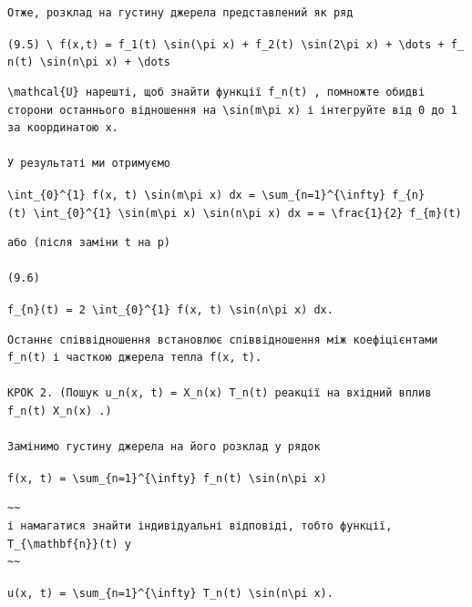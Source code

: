 \documentclass[
  ukrainian,
]{article}
\begin{document}
\begin{verbatim}
Отже, розклад на густину джерела представлений як ряд
\end{verbatim}

\texttt{(9.5)\ \textbackslash{}\ f(x,t)\ =\ f\_1(t)\ \textbackslash{}sin(\textbackslash{}pi\ x)\ +\ f\_2(t)\ \textbackslash{}sin(2\textbackslash{}pi\ x)\ +\ \textbackslash{}dots\ +\ f\_n(t)\ \textbackslash{}sin(n\textbackslash{}pi\ x)\ +\ \textbackslash{}dots}

\begin{verbatim}
\mathcal{U} нарешті, щоб знайти функції f_n(t) , помножте обидві сторони останнього відношення на \sin(m\pi x) і інтегруйте від 0 до 1 за координатою x.

У результаті ми отримуємо
\end{verbatim}

\texttt{\textbackslash{}int\_\{0\}\^{}\{1\}\ f(x,\ t)\ \textbackslash{}sin(m\textbackslash{}pi\ x)\ dx\ =\ \textbackslash{}sum\_\{n=1\}\^{}\{\textbackslash{}infty\}\ f\_\{n\}(t)\ \textbackslash{}int\_\{0\}\^{}\{1\}\ \textbackslash{}sin(m\textbackslash{}pi\ x)\ \textbackslash{}sin(n\textbackslash{}pi\ x)\ dx\ =}
\texttt{=\ \textbackslash{}frac\{1\}\{2\}\ f\_\{m\}(t)}

\begin{verbatim}
або (після заміни t на p)

(9.6)
\end{verbatim}

\texttt{f\_\{n\}(t)\ =\ 2\ \textbackslash{}int\_\{0\}\^{}\{1\}\ f(x,\ t)\ \textbackslash{}sin(n\textbackslash{}pi\ x)\ dx.}

\begin{verbatim}
Останнє співвідношення встановлює співвідношення між коефіцієнтами f_n(t) і часткою джерела тепла f(x, t).

КРОК 2. (Пошук u_n(x, t) = X_n(x) T_n(t) реакції на вхідний вплив f_n(t) X_n(x) .)

Замінимо густину джерела на його розклад у рядок
\end{verbatim}

\texttt{f(x,\ t)\ =\ \textbackslash{}sum\_\{n=1\}\^{}\{\textbackslash{}infty\}\ f\_n(t)\ \textbackslash{}sin(n\textbackslash{}pi\ x)}

\begin{verbatim}
~~
і намагатися знайти індивідуальні відповіді, тобто функції, T_{\mathbf{n}}(t) у
~~
\end{verbatim}

\texttt{u(x,\ t)\ =\ \textbackslash{}sum\_\{n=1\}\^{}\{\textbackslash{}infty\}\ T\_n(t)\ \textbackslash{}sin(n\textbackslash{}pi\ x).}
\end{document}
